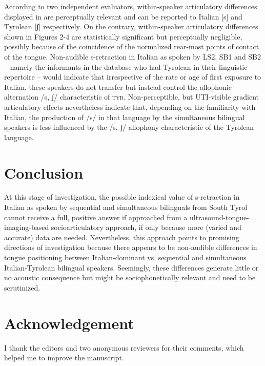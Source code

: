 \documentclass[output=paper]{LSP/langsci}
\begin{document}
According to two independent evaluators, within-speaker articulatory differences displayed in  are perceptually relevant and can be reported to Italian [s] and Tyrolean [ʃ] respectively. On the contrary, within-speaker articulatory differences shown in Figures 2-4 are statistically significant but perceptually negligible, possibly because of the coincidence of the normalized rear-most points of contact of the tongue. Non-audible s-retraction in Italian as spoken by LS2, SB1 and SB2 – namely the informants in the database who had Tyrolean in their linguistic repertoire – would indicate that irrespective of the rate or age of first exposure to Italian, these speakers do not transfer but instead control the allophonic alternation /s, ʃ/ characteristic of \textsc{tyr}. Non-perceptible, but UTI-visible gradient articulatory effects nevertheless indicate that, depending on the familiarity with Italian, the production of /s/ in that language by the simultaneous bilingual speakers is less influenced by the /s, ʃ/ allophony characteristic of the Tyrolean language.

\section{Conclusion}
At this stage of investigation, the possible indexical value of s-retraction in Italian as spoken by sequential and simultaneous bilinguals from South Tyrol cannot receive a full, positive answer if approached from a ultrasound-tongue-imaging-based socioarticulatory approach, if only because more (varied and accurate) data are needed. Nevertheless, this approach points to promising directions of investigation because there appears to be non-audible differences in tongue positioning between Italian-dominant vs. sequential and simultaneous Italian-Tyrolean bilingual speakers. Seemingly, these differences generate little or no acoustic consequence but might be sociophonetically relevant and need to be scrutinized.

\section*{Acknowledgement}
I thank the editors and two anonymous reviewers for their comments, which helped me to improve the manuscript.

\printbibliography[heading=subbibliography,notkeyword=this]
\end{document}
